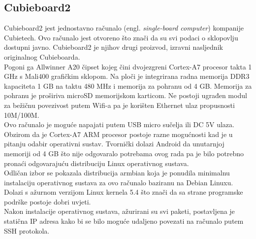 \documentclass[times, utf8, zavrsni]{fer}
\begin{document}
\subsection{Cubieboard2}
Cubieboard2 jest jednostavno računalo (engl. \emph{single-board computer}) kompanije Cubietech. Ovo računalo jest otvoreno
što znači da su svi podaci o sklopovlju dostupni javno. Cubieboard2 je njihov drugi proizvod, izravni nasljednik originalnog Cubieboarda.\\
Pogoni ga Allwinner A20 čipset kojeg čini dvojezgreni Cortex-A7 procesor takta 1 GHz s Mali400 grafičkim sklopom. 
Na ploči je integrirana radna memorija DDR3 kapaciteta 1 GB na taktu 480 MHz i memorija za pohranu od 4 GB. Memorija za pohranu je 
proširiva microSD memorijskom karticom.
Ne postoji ugrađen modul za bežičnu povezivost putem Wifi-a pa je korišten Ethernet ulaz propusnosti 10M/100M. \\
Ovo računalo je moguće napajati putem USB micro sučelja ili DC 5V ulaza. \\
Obzirom da je Cortex-A7 ARM procesor postoje razne mogućnosti kad je u pitanju odabir operativni sustav. Tvornički dolazi
Android da unutarnjoj memoriji od 4 GB što nije odgovaralo potrebama ovog rada pa je bilo potrebno pronaći odgovarajuću distribuciju
Linux operativnog sustava.\\ Odličan izbor se pokazala distribucija armbian koja je ponudila minimalnu instalaciju operativnog sustava
za ovo računalo baziranu na Debian Linuxu. Dolazi s ažurnom verzijom Linux kernela 5.4 što znači da sa strane programske podrške
postoje dobri uvjeti. \\
Nakon instalacije operativnog sustava, ažurirani su svi paketi, postavljena je statična IP adresa kako bi se bilo moguće udaljeno
povezati na računalo putem SSH protokola. 
\end{document}
